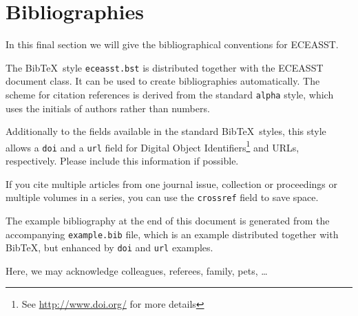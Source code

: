 \documentclass{eceasst}
\begin{document}
\section{Bibliographies}
In this final section we will give the bibliographical conventions for
ECEASST.

The Bib\TeX\ style \verb|eceasst.bst| is distributed together with the ECEASST
document class.
It can be used to create bibliographies automatically.
The scheme for citation references is derived from the standard \verb|alpha|
style, which uses the initials of authors rather than numbers.

Additionally to the fields available in the standard Bib\TeX\ styles, this style
allows a \verb|doi| and a \verb|url| field for Digital Object
Identifiers\footnote{See \url{http://www.doi.org/} for more details} and URLs,
respectively.
Please include this information if possible.

If you cite multiple articles from one journal issue, collection or proceedings
or multiple volumes in a series, you can use the \verb|crossref| field to save
space.

The example bibliography at the end of this document is generated from the
accompanying \verb|example.bib| file, which is an example distributed together
with Bib\TeX, but enhanced by \verb|doi| and \verb|url| examples.



\begin{acknowledge}
Here, we may acknowledge colleagues, referees, family, pets, \dots
\end{acknowledge}

\nocite{*}


\end{document}
